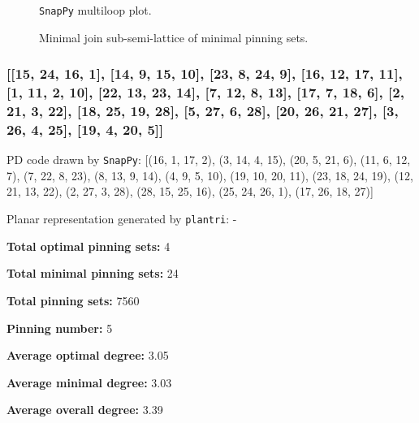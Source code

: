 \documentclass{article}%
\begin{document}
\begin{multicols}{2}
\begin{figure}[H]
\centering

\caption{\texttt{SnapPy} multiloop plot.}
\label{fig:tex/img/[[10, 20, 1, 11], [11, 21, 12, 24], [9, 23, 10, 24], [19, 22, 20, 23], [1, 22, 2, 21], [12, 8, 13, 9], [13, 18, 14, 19], [2, 7, 3, 8], [3, 17, 4, 18], [14, 25, 15, 28], [6, 27, 7, 28], [16, 26, 17, 27.svg}
\end{figure}
\columnbreak

\begin{figure}[H]
\centering
\scalebox{0.8}{}
\caption{Minimal join sub-semi-lattice of minimal pinning sets.}
\label{fig:tex/img/[[10, 20, 1, 11], [11, 21, 12, 24], [9, 23, 10, 24], [19, 22, 20, 23], [1, 22, 2, 21], [12, 8, 13, 9], [13, 18, 14, 19], [2, 7, 3, 8], [3, 17, 4, 18], [14, 25, 15, 28], [6, 27, 7, 28], [16, 26, 17, 27.pgf}
\end{figure}
\end{multicols}

\newpage

\subsubsection{[[15, 24, 16, 1], [14, 9, 15, 10], [23, 8, 24, 9], [16, 12, 17, 11], [1, 11, 2, 10], [22, 13, 23, 14], [7, 12, 8, 13], [17, 7, 18, 6], [2, 21, 3, 22], [18, 25, 19, 28], [5, 27, 6, 28], [20, 26, 21, 27], [3, 26, 4, 25], [19, 4, 20, 5]]}

{\small\noindent PD code drawn by \texttt{SnapPy}: [(16, 1, 17, 2), (3, 14, 4, 15), (20, 5, 21, 6), (11, 6, 12, 7), (7, 22, 8, 23), (8, 13, 9, 14), (4, 9, 5, 10), (19, 10, 20, 11), (23, 18, 24, 19), (12, 21, 13, 22), (2, 27, 3, 28), (28, 15, 25, 16), (25, 24, 26, 1), (17, 26, 18, 27)]}

{\small\noindent Planar representation generated by \texttt{plantri}: -}

\begin{multicols}{2}
{\normalsize \noindent\textbf{Total optimal pinning sets:} 4

\noindent\textbf{Total minimal pinning sets:} 24

\noindent\textbf{Total pinning sets:} 7560

\noindent\textbf{Pinning number:} 5

}
\columnbreak

{\normalsize \noindent\textbf{Average optimal degree:} 3.05

\noindent\textbf{Average minimal degree:} 3.03

\noindent\textbf{Average overall degree:} 3.39

}
\end{multicols}
\end{document}
